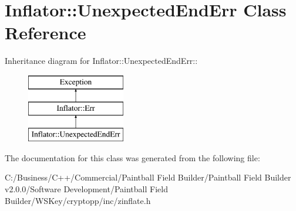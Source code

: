 \hypertarget{class_inflator_1_1_unexpected_end_err}{
\section{Inflator::UnexpectedEndErr Class Reference}
\label{class_inflator_1_1_unexpected_end_err}
}
Inheritance diagram for Inflator::UnexpectedEndErr::\begin{figure}[H]
\begin{center}
\leavevmode
\includegraphics[height=3cm]{class_inflator_1_1_unexpected_end_err}
\end{center}
\end{figure}


The documentation for this class was generated from the following file:\begin{DoxyCompactItemize}
\item 
C:/Business/C++/Commercial/Paintball Field Builder/Paintball Field Builder v2.0.0/Software Development/Paintball Field Builder/WSKey/cryptopp/inc/zinflate.h\end{DoxyCompactItemize}

